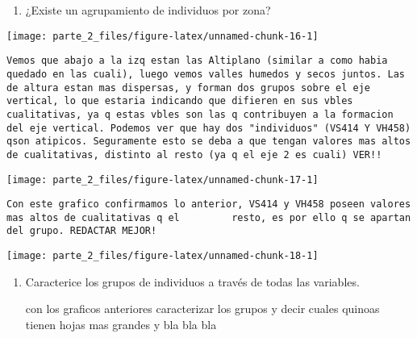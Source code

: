 \documentclass[
]{article}
\providecommand{\tightlist}{%
  \setlength{\itemsep}{0pt}\setlength{\parskip}{0pt}}
\begin{document}
\begin{enumerate}
\def\labelenumi{\alph{enumi})}
\setcounter{enumi}{3}
\tightlist
\item
  ¿Existe un agrupamiento de individuos por zona?
\end{enumerate}

\begin{center}\texttt{[image: parte\_2\_files/figure-latex/unnamed-chunk-16-1]} \end{center}

\begin{verbatim}
Vemos que abajo a la izq estan las Altiplano (similar a como habia quedado en las cuali), luego vemos valles humedos y secos juntos. Las de altura estan mas dispersas, y forman dos grupos sobre el eje vertical, lo que estaria indicando que difieren en sus vbles cualitativas, ya q estas vbles son las q contribuyen a la formacion del eje vertical. Podemos ver que hay dos "individuos" (VS414 Y VH458) qson atipicos. Seguramente esto se deba a que tengan valores mas altos de cualitativas, distinto al resto (ya q el eje 2 es cuali) VER!!
\end{verbatim}

\begin{center}\texttt{[image: parte\_2\_files/figure-latex/unnamed-chunk-17-1]} \end{center}

\begin{verbatim}
Con este grafico confirmamos lo anterior, VS414 y VH458 poseen valores mas altos de cualitativas q el         resto, es por ello q se apartan del grupo. REDACTAR MEJOR!  
\end{verbatim}

\begin{center}\texttt{[image: parte\_2\_files/figure-latex/unnamed-chunk-18-1]} \end{center}

\begin{enumerate}
\def\labelenumi{\alph{enumi})}
\setcounter{enumi}{4}
\item
  Caracterice los grupos de individuos a través de todas las variables.

  con los graficos anteriores caracterizar los grupos y decir cuales
  quinoas tienen hojas mas grandes y bla bla bla
\end{enumerate}
\end{document}

